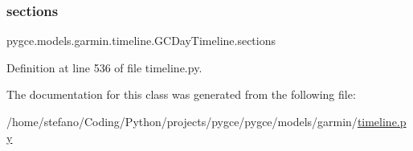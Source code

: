 \subsubsection{\texorpdfstring{sections}{sections}}
{\footnotesize\ttfamily pygce.\+models.\+garmin.\+timeline.\+G\+C\+Day\+Timeline.\+sections}



Definition at line 536 of file timeline.\+py.



The documentation for this class was generated from the following file\+:\begin{DoxyCompactItemize}
\item 
/home/stefano/\+Coding/\+Python/projects/pygce/pygce/models/garmin/\hyperlink{timeline_8py}{timeline.\+py}\end{DoxyCompactItemize}
